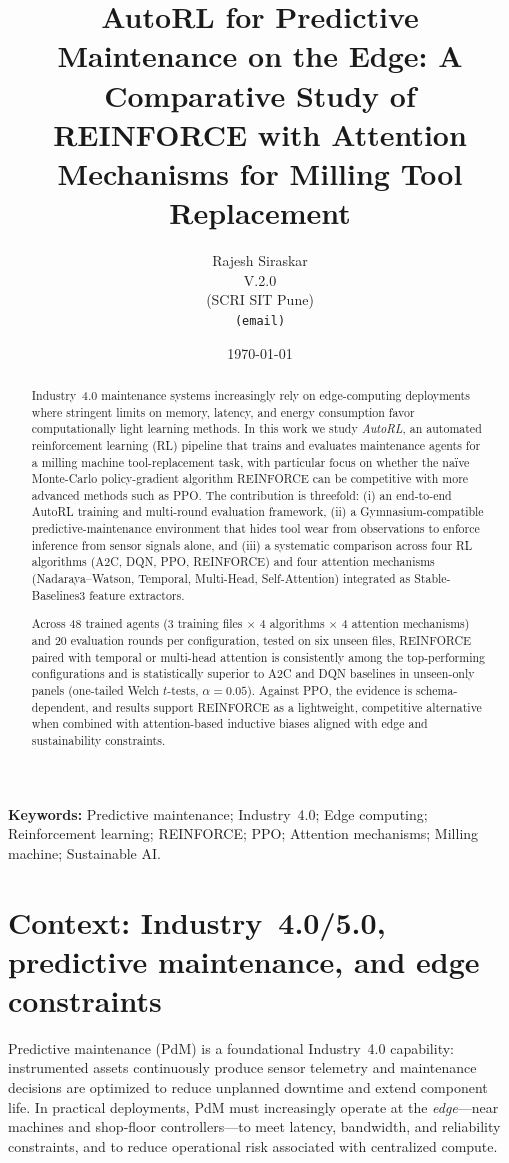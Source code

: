 \documentclass[11pt]{article}
\title{AutoRL for Predictive Maintenance on the Edge: \texorpdfstring{\newline}{ }A Comparative Study of REINFORCE with Attention Mechanisms for Milling Tool Replacement}
\author{Rajesh Siraskar\\
\small V.2.0\\
\small (SCRI SIT Pune)\\
\small \texttt{(email)}
}
\date{\today}
\begin{document}
\maketitle

\begin{abstract}
Industry~4.0 maintenance systems increasingly rely on edge-computing deployments where stringent limits on memory, latency, and energy consumption favor computationally light learning methods. In this work we study \emph{AutoRL}, an automated reinforcement learning (RL) pipeline that trains and evaluates maintenance agents for a milling machine tool-replacement task, with particular focus on whether the na\"{i}ve Monte-Carlo policy-gradient algorithm \textsc{REINFORCE} can be competitive with more advanced methods such as \textsc{PPO}. The contribution is threefold: (i) an end-to-end AutoRL training and multi-round evaluation framework, (ii) a Gymnasium-compatible predictive-maintenance environment that hides tool wear from observations to enforce inference from sensor signals alone, and (iii) a systematic comparison across four RL algorithms (\textsc{A2C}, \textsc{DQN}, \textsc{PPO}, \textsc{REINFORCE}) and four attention mechanisms (Nadaraya--Watson, Temporal, Multi-Head, Self-Attention) integrated as Stable-Baselines3 feature extractors.

Across 48 trained agents (3 training files $\times$ 4 algorithms $\times$ 4 attention mechanisms) and 20 evaluation rounds per configuration, tested on six unseen files, \textsc{REINFORCE} paired with temporal or multi-head attention is consistently among the top-performing configurations and is statistically superior to A2C and DQN baselines in unseen-only panels (one-tailed Welch $t$-tests, $\alpha=0.05$). Against PPO, the evidence is schema-dependent, and results support \textsc{REINFORCE} as a lightweight, competitive alternative when combined with attention-based inductive biases aligned with edge and sustainability constraints.
\end{abstract}

\textbf{Keywords:} Predictive maintenance; Industry~4.0; Edge computing; Reinforcement learning; \textsc{REINFORCE}; \textsc{PPO}; Attention mechanisms; Milling machine; Sustainable AI.

\section{Context: Industry~4.0/5.0, predictive maintenance, and edge constraints}
Predictive maintenance (PdM) is a foundational Industry~4.0 capability: instrumented assets continuously produce sensor telemetry and maintenance decisions are optimized to reduce unplanned downtime and extend component life. In practical deployments, PdM must increasingly operate at the \emph{edge}---near machines and shop-floor controllers---to meet latency, bandwidth, and reliability constraints, and to reduce operational risk associated with centralized compute.
\end{document}
